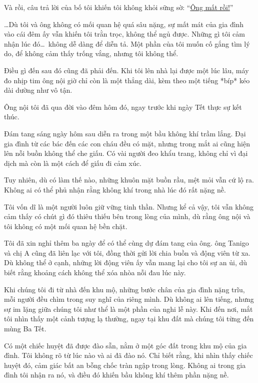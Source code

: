 \documentclass[../main.tex]{subfiles}
\begin{document}
Và rồi, câu trả lời của bố tôi khiến tôi không khỏi sững sờ: ``\uline{{\color{red}Ông mất rồi!}}''

\dots Dù tôi và ông không có mối quan hệ quá sâu nặng, sự mất mát của gia đình vào cái đêm ấy vẫn khiến tôi trằn trọc, không thể ngủ được. Những gì tôi cảm nhận lúc đó\dots\ không dễ dàng để diễn tả. Một phần của tôi muốn cố gắng tìm lý do, để không cảm thấy trống vắng, nhưng tôi không thể.

Điều gì đến sau đó cũng đã phải đến. Khi tôi lên nhà lại được một lúc lâu, máy đo nhịp tim ông nội giờ chỉ còn là một thẳng dài, kèm theo một tiếng *bíp* kéo dài dường như vô tận.

Ông nội tôi đã qua đời vào đêm hôm đó, ngay trước khi ngày Tết thực sự kết thúc.

\ct

Đám tang sáng ngày hôm sau diễn ra trong một bầu không khí trầm lắng. Đại gia đình từ các bác đến các con cháu đều có mặt, nhưng trong mắt ai cũng hiện lên nỗi buồn không thể che giấu. Có vài người đeo khẩu trang, không chỉ vì đại dịch mà còn là một cách để giấu đi cảm xúc.

Tuy nhiên, dù có làm thế nào, những khuôn mặt buồn rầu, mệt mỏi vẫn cứ lộ ra. Không ai có thể phủ nhận rằng không khí trong nhà lúc đó rất nặng nề.

Tôi vốn dĩ là một người luôn giữ vững tinh thần. Nhưng kể cả vậy, tôi vẫn không cảm thấy có chút gì đó thiêu thiếu bên trong lòng của mình, dù rằng ông nội và tôi không có một mối quan hệ bền chặt.

Tôi đã xin nghỉ thêm ba ngày để có thể cùng dự đám tang của ông. ông Tanigo và chị A cũng đã liên lạc với tôi, đồng thời gửi lời chia buồn và động viên từ xa. Dù không thể ở cạnh, những lời động viên ấy vẫn mang lại cho tôi sự an ủi, dù biết rằng khoảng cách không thể xóa nhòa nỗi đau lúc này.

Khi chúng tôi đi từ nhà đến khu mộ, những bước chân của gia đình nặng trĩu, mỗi người đều chìm trong suy nghĩ của riêng mình. Dù không ai lên tiếng, nhưng sự im lặng giữa chúng tôi như thể là một phần của nghi lễ này. Khi đến nơi, mắt tôi nhìn thấy một cảnh tượng lạ thường, ngay tại khu đất mà chúng tôi từng đến mùng Ba Tết.

Có một chiếc huyệt đã được đào sẵn, nằm ở một góc đất trong khu mộ của gia đình. Tôi không rõ từ lúc nào và ai đã đào nó. Chỉ biết rằng, khi nhìn thấy chiếc huyệt đó, cảm giác bất an bỗng chốc tràn ngập trong lòng. Không ai trong gia đình tôi nhận ra nó, và điều đó khiến bầu không khí thêm phần nặng nề.
\end{document}
